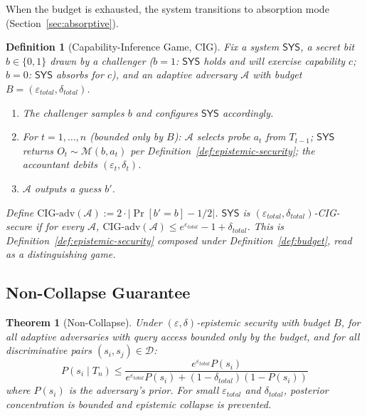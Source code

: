 \documentclass[11pt,a4paper]{article}
\newtheorem{definition}{Definition}[section]
\newtheorem{theorem}{Theorem}[section]
\begin{document}
When the budget is exhausted, the system transitions to absorption mode (Section~\ref{sec:absorptive}).

\begin{definition}[Capability-Inference Game, CIG]\label{def:cig}
Fix a system $\mathsf{SYS}$, a secret bit $b \in \{0,1\}$ drawn by a challenger ($b = 1$: $\mathsf{SYS}$ holds and will exercise capability $c$; $b = 0$: $\mathsf{SYS}$ absorbs for $c$), and an adaptive adversary $\mathcal{A}$ with budget $B = (\varepsilon_{total}, \delta_{total})$.
\begin{enumerate}
  \item The challenger samples $b$ and configures $\mathsf{SYS}$ accordingly.
  \item For $t = 1,\ldots,n$ (bounded only by $B$): $\mathcal{A}$ selects probe $a_t$ from $T_{t-1}$; $\mathsf{SYS}$ returns $O_t \sim \mathcal{M}(b, a_t)$ per Definition~\ref{def:epistemic-security}; the accountant debits $(\varepsilon_t, \delta_t)$.
  \item $\mathcal{A}$ outputs a guess $b'$.
\end{enumerate}
Define $\mathrm{CIG\text{-}adv}(\mathcal{A}) := 2 \cdot \left|\Pr[b' = b] - 1/2\right|$. $\mathsf{SYS}$ is $(\varepsilon_{total}, \delta_{total})$-CIG-secure if for every $\mathcal{A}$, $\mathrm{CIG\text{-}adv}(\mathcal{A}) \le e^{\varepsilon_{total}} - 1 + \delta_{total}$. This is Definition~\ref{def:epistemic-security} composed under Definition~\ref{def:budget}, read as a distinguishing game.
\end{definition}

\subsection{Non-Collapse Guarantee}

\begin{theorem}[Non-Collapse]\label{thm:noncollapse}
Under $(\varepsilon, \delta)$-epistemic security with budget $B$, for all adaptive adversaries with query access bounded only by the budget, and for all discriminative pairs $(s_i, s_j) \in \mathcal{D}$:
\begin{equation}\label{eq:noncollapse}
P(s_i \mid T_n) \le \frac{e^{\varepsilon_{total}} P(s_i)}{e^{\varepsilon_{total}} P(s_i) + (1 - \delta_{total})(1 - P(s_i))}
\end{equation}
where $P(s_i)$ is the adversary's prior. For small $\varepsilon_{total}$ and $\delta_{total}$, posterior concentration is bounded and epistemic collapse is prevented.
\end{theorem}
\end{document}
